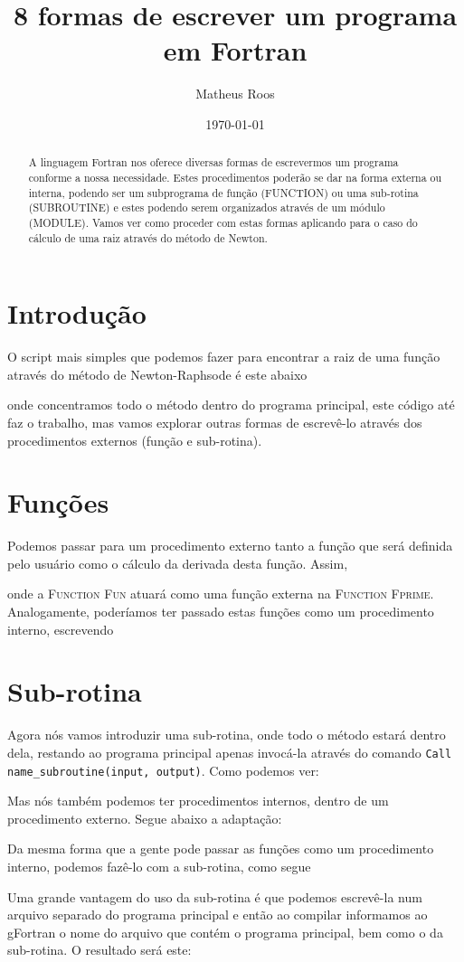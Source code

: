 \documentclass[a4paper,12pt]{extarticle}
\author{Matheus Roos}
\title{8 formas de escrever um programa em Fortran}
\date{\today}
\begin{document}
	\maketitle
	\begin{abstract}
		A linguagem Fortran nos oferece diversas formas de escrevermos um programa conforme a nossa necessidade. Estes procedimentos poderão se dar na forma externa ou interna, podendo ser um subprograma de função (FUNCTION) ou uma sub-rotina (SUBROUTINE) e estes podendo serem organizados através de um módulo (MODULE). Vamos ver como proceder com estas formas aplicando para o caso do cálculo de uma raiz através do método de Newton.
	\end{abstract}
\section*{Introdução}
	O script mais simples que podemos fazer para encontrar a raiz de uma função através do método de Newton-Raphsode é este abaixo


 onde concentramos todo o método dentro do programa principal, este código até faz o trabalho, mas vamos explorar outras formas de escrevê-lo através dos procedimentos externos (função e sub-rotina).
 
 \section{Funções}
 Podemos passar para um procedimento externo tanto a função que será definida pelo usuário como o cálculo da derivada desta função. Assim,
 
 onde a \textsc{Function Fun} atuará como uma função externa na \textsc{Function Fprime}.
\newpage
 Analogamente, poderíamos ter passado estas funções como um procedimento interno, escrevendo
 
 \newpage
\section{Sub-rotina}
 Agora nós vamos introduzir uma sub-rotina, onde todo o método estará dentro dela, restando ao programa principal apenas invocá-la através do comando \verb|Call name_subroutine(input, output)|. Como podemos ver:
 
\newpage
 Mas nós também podemos ter procedimentos internos, dentro de um procedimento externo. Segue abaixo a adaptação:
 
\newpage
 Da mesma forma que a gente pode passar as funções como um procedimento interno, podemos fazê-lo com a sub-rotina, como segue 
 
\newpage
 Uma grande vantagem do uso da sub-rotina é que podemos escrevê-la num arquivo separado do programa principal e então ao compilar informamos ao gFortran o nome do arquivo que contém o programa principal, bem como o da sub-rotina. O resultado será este:\\
 
\end{document}
